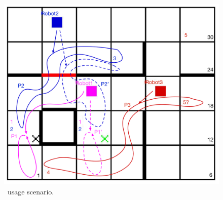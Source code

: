 \begin{figure}[t]
\begin{center}
\includegraphics[width=1\linewidth]{Figures/arrows-v3.pdf}
\caption{\toolName\ usage scenario.}
\label{fig:outputexample}
\vspace{-.5cm}
\end{center}
\end{figure}





